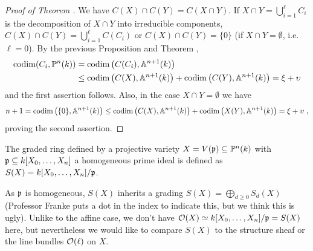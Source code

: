 \documentclass[a4paper,parskip=half,numbers=enddot, DIV=12]{scrreprt}
\begin{document}
\begin{proof}[Proof of Theorem ]
    We have $C(X)\cap C(Y) = C(X\cap Y)$. If $X\cap Y= \bigcup_{i=1}^\ell C_i$ is the decomposition of $X\cap Y$ into irreducible components, $C(X)\cap C(Y) = \bigcup_{i=1}^\ell C(C_i)$ or $C(X) \cap C(Y) = \{0\}$ (if $X\cap Y=\emptyset$, i.e. $\ell=0$). By the previous Proposition and Theorem , 
    \begin{align*}
    	 \operatorname{codim}(C_i, \mathbb{P}^n(k)) &= \operatorname{codim}\big(C(C_i), \mathbb{A}^{n+1}(k)\big)\\
    	 & \leq \operatorname{codim}\big(C(X), \mathbb{A}^{n+1}(k)\big) +\operatorname{codim}\big(C(Y), \mathbb{A}^{n+1}(k)\big)= \xi+\upsilon 
    \end{align*}
   and the first assertion follows. Also, in the case $X\cap Y =\emptyset$ we have 
   \begin{align*}
	   	n+1 = \operatorname{codim}\big(\{0\}, \mathbb{A}^{n+1}(k)\big) \leq \operatorname{codim}\big(C(X),\mathbb{A}^{n+1}(k)\big)+\operatorname{codim}\big(X(Y), \mathbb{A}^{n+1}(k)\big) = \xi +\upsilon\;, 
   \end{align*}
   proving the second assertion.
\end{proof}
\begin{defi}
    The graded ring defined by a projective variety $X= V(\mathfrak{p}) \subseteq \mathbb{P}^n(k)$ with $\mathfrak{p}\subseteq k[X_0,\ldots,X_n]$ a homogeneous prime ideal is defined as $S(X) = k[X_0,\ldots, X_n]/\mathfrak{p}$. 
\end{defi}
As $\mathfrak{p}$ is homogeneous, $S(X)$ inherits a grading $S(X)=\bigoplus_{d\geq 0}S_d(X)$ (Professor Franke puts a dot in the index to indicate this, but we think this is ugly). Unlike to the affine case, we don't have $\mathcal{O}(X)\simeq k[X_0,\ldots,X_n]/\mathfrak{p}=S(X)$ here, but nevertheless we would like to compare $S(X)$ to the structure sheaf or the line bundles $\mathcal{O}(\ell)$ on $X$.
\end{document}
